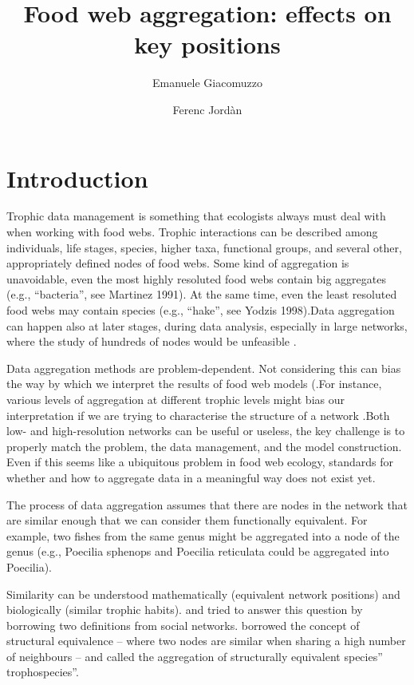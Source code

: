 \documentclass[twocolumn]{article}
\title{Food web aggregation: effects on key positions}
\author[1]{Emanuele Giacomuzzo}
\author[1,2]{Ferenc Jordàn}
\affil[1]{Central European University, Budapest, 1051, Hungary}
\affil[2]{Stazione Zoologica Anton Dohrn, Napoli, 80122, Italy}
\date{}
\begin{document}
\maketitle
\section*{Introduction}
	\par
	Trophic data management is something that ecologists always must deal with when working with food webs.
	Trophic interactions can be described among individuals, life stages, species, higher taxa, functional groups, and several other, appropriately defined nodes of food webs.
	Some kind of aggregation is unavoidable, even the most highly resoluted food webs contain big aggregates (e.g., “bacteria'', see Martinez 1991).
	At the same time, even the least resoluted food webs may contain species (e.g., “hake”, see Yodzis 1998).Data aggregation can happen also at later stages, during data analysis, especially in large networks, where the study of hundreds of nodes would be unfeasible \citep{Yodzis1999}.
	\par
	Data aggregation methods are problem-dependent. Not considering this can bias the way by which we interpret the results of food web models (\citep{Paine1988, Hall1993}.For instance, various levels of aggregation at different trophic levels might bias our interpretation if we are trying to characterise the structure of a network \citep{Yodzis1999}.Both low- and high-resolution networks can be useful or useless, the key challenge is to properly match the problem, the data management, and the model construction.
	Even if this seems like a ubiquitous problem in food web ecology, standards for whether and how to aggregate data in a meaningful way does not exist yet.
	\par
	The process of data aggregation assumes that there are nodes in the network that are similar enough that we can consider them functionally equivalent.
	For example, two fishes from the same genus might be aggregated into a node of the genus (e.g., Poecilia sphenops and Poecilia reticulata could be aggregated into Poecilia).
	\par
	Similarity can be understood mathematically (equivalent network positions) and biologically (similar trophic habits).
	\citet{Yodzis1999} and \citet{Luczkovich2003} tried to answer this question by borrowing two definitions from social networks. \citet{Yodzis1999} borrowed the concept of structural equivalence – where two nodes are similar when sharing a high number of neighbours – and called the aggregation of structurally equivalent species” trophospecies”.
\end{document}
